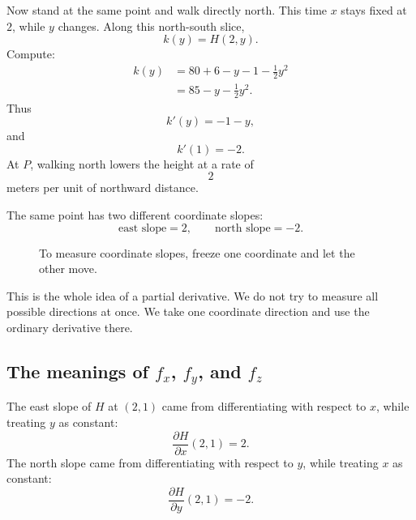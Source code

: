 Now stand at the same point and walk directly north.  This time \(x\) stays fixed at
\(2\), while \(y\) changes.  Along this north-south slice,
\[
    k(y)=H(2,y).
\]
Compute:
\[
\begin{aligned}
    k(y)
    &=
    80+6-y-1-\frac12y^2 \\
    &=
    85-y-\frac12y^2.
\end{aligned}
\]
Thus
\[
    k'(y)=-1-y,
\]
and
\[
    k'(1)=-2.
\]
At \(P\), walking north lowers the height at a rate of
\[
    2
\]
meters per unit of northward distance.

The same point has two different coordinate slopes:
\[
    \text{east slope}=2,
    \qquad
    \text{north slope}=-2.
\]

\begin{figure}[h]
\centering
{}
\caption{To measure coordinate slopes, freeze one coordinate and let the other move.}
\end{figure}

This is the whole idea of a partial derivative.  We do not try to measure all possible
directions at once.  We take one coordinate direction and use the ordinary derivative
there.

\subsection{The meanings of \texorpdfstring{\(f_x\), \(f_y\), and \(f_z\)}{fx, fy, and fz}}

The east slope of \(H\) at \((2,1)\) came from differentiating with respect to \(x\),
while treating \(y\) as constant:
\[
    \frac{\partial H}{\partial x}(2,1)=2.
\]
The north slope came from differentiating with respect to \(y\), while treating \(x\)
as constant:
\[
    \frac{\partial H}{\partial y}(2,1)=-2.
\]

